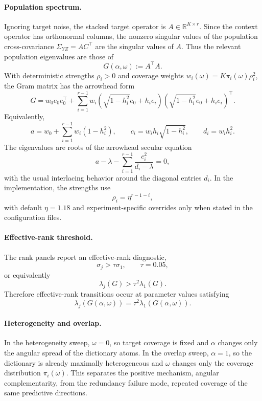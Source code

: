 \paragraph{Population spectrum.}
Ignoring target noise, the stacked target operator is $A\in\mathbb{R}^{K\times r}$.
Since the context operator has orthonormal columns, the nonzero singular values
of the population cross-covariance $\Sigma_{YZ}=AC^\top$ are the singular values
of $A$.  Thus the relevant population eigenvalues are those of
\[
    G(\alpha,\omega) := A^\top A .
\]
With deterministic strengths $\rho_i>0$ and coverage weights
$w_i(\omega)=K\pi_i(\omega)\rho_i^2$, the Gram matrix has the arrowhead form
\[
    G =
    w_0 e_0e_0^\top
    +
    \sum_{i=1}^{r-1}
    w_i
    \left(\sqrt{1-h_i^2}e_0+h_i e_i\right)
    \left(\sqrt{1-h_i^2}e_0+h_i e_i\right)^\top .
\]
Equivalently,
\[
    a=w_0+\sum_{i=1}^{r-1}w_i(1-h_i^2),
    \qquad
    c_i=w_i h_i\sqrt{1-h_i^2},
    \qquad
    d_i=w_i h_i^2.
\]
The eigenvalues are roots of the arrowhead secular equation
\[
    a-\lambda
    -
    \sum_{i=1}^{r-1}\frac{c_i^2}{d_i-\lambda}
    =0,
\]
with the usual interlacing behavior around the diagonal entries $d_i$.
In the implementation, the strengths use
\[
    \rho_i = \eta^{r-1-i},
\]
with default $\eta=1.18$ and experiment-specific overrides only when stated in
the configuration files.

\paragraph{Effective-rank threshold.}
The rank panels report an effective-rank diagnostic,
\[
    \sigma_j > \tau\sigma_1,
    \qquad \tau=0.05,
\]
or equivalently
\[
    \lambda_j(G) > \tau^2\lambda_1(G).
\]
Therefore effective-rank transitions occur at parameter values satisfying
\[
    \lambda_j(G(\alpha,\omega))
    =
    \tau^2\lambda_1(G(\alpha,\omega)).
\]

\paragraph{Heterogeneity and overlap.}
In the heterogeneity sweep, $\omega=0$, so target coverage is fixed and
$\alpha$ changes only the angular spread of the dictionary atoms.  In the
overlap sweep, $\alpha=1$, so the dictionary is already maximally heterogeneous
and $\omega$ changes only the coverage distribution $\pi_i(\omega)$.  This
separates the positive mechanism, angular complementarity, from the redundancy
failure mode, repeated coverage of the same predictive directions.
